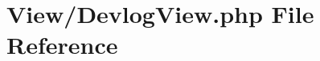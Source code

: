 \hypertarget{_devlog_view_8php}{}\section{View/\+Devlog\+View.php File Reference}
\label{_devlog_view_8php}
